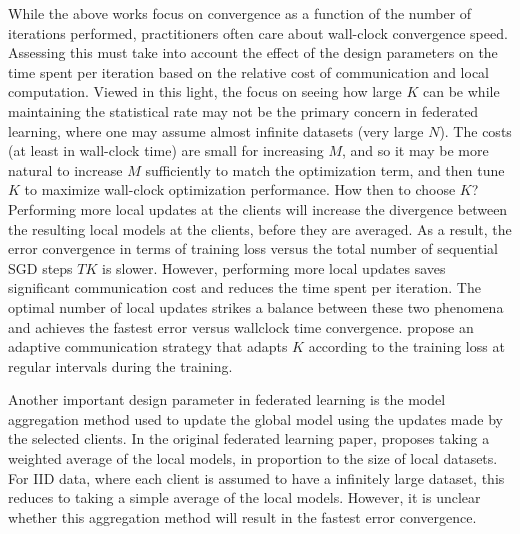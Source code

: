 While the above works focus on convergence as a function of the number of iterations performed, practitioners often care about wall-clock convergence speed. Assessing this must take into account the effect of the design parameters on the time spent per iteration based on the relative cost of communication and local computation. Viewed in this light, the focus on seeing how large $K$ can be while maintaining the statistical rate may not be the primary concern in federated learning, where one may assume almost infinite datasets (very large $N$). The costs (at least in wall-clock time) are small for increasing $M$, and so it may be more natural to increase $M$ sufficiently to match the optimization term, and then tune $K$ to maximize wall-clock optimization performance. 
How then to choose $K$? Performing more local updates at the clients will increase the divergence between the resulting local models at the clients, before they are averaged. As a result, the error convergence in terms of training loss versus the total number of sequential SGD steps $TK$ is slower. However, performing more local updates saves significant communication cost and reduces the time spent per iteration. The optimal number of local updates strikes a balance between these two phenomena and achieves the fastest error versus wallclock time convergence. \citet{wang2018adaptive} propose an adaptive communication strategy that adapts $K$ according to the training loss at regular intervals during the training.

Another important design parameter in federated learning is the model aggregation method used to update the global model using the updates made by the selected clients. In the original federated learning paper, \citet{mcmahan17fedavg} proposes taking a weighted average of the local models, in proportion to the size of local datasets. For IID data, where each client is assumed to have a infinitely large dataset, this reduces to taking a simple average of the local models. However, it is unclear whether this aggregation method will result in the fastest error convergence. 


